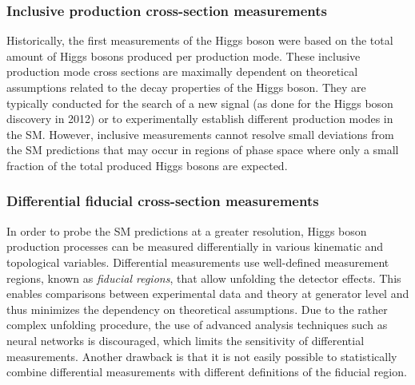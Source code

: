 \subsubsection{Inclusive production cross-section measurements}
Historically, the first measurements of the Higgs boson were based on the total amount of Higgs bosons produced per production mode.
These inclusive production mode cross sections are maximally dependent on theoretical assumptions related to the decay properties of the Higgs boson.
They are typically conducted for the search of a new signal (as done for the Higgs boson discovery in 2012) or to experimentally establish different production modes in the SM.
However, inclusive measurements cannot resolve small deviations from the SM predictions that may occur in regions of phase space where only a small fraction of the total produced Higgs bosons are expected.

\subsubsection{Differential fiducial cross-section measurements}
In order to probe the SM predictions at a greater resolution, Higgs boson production processes can be measured differentially in various kinematic and topological variables.
Differential measurements use well-defined measurement regions, known as \emph{fiducial regions}, that allow unfolding the detector effects. 
This enables comparisons between experimental data and theory at generator level and thus minimizes the dependency on theoretical assumptions. 
Due to the rather complex unfolding procedure, the use of advanced analysis techniques such as neural networks is discouraged, which limits the sensitivity of differential measurements.
Another drawback is that it is not easily possible to statistically combine differential measurements with different definitions of the fiducial region.  



